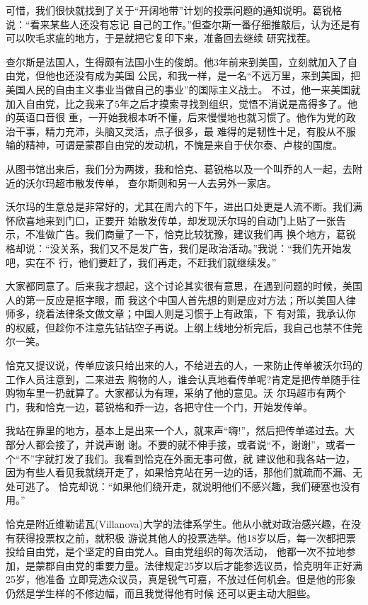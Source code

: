 ﻿\documentclass[11pt]{article}
\begin{document}
可惜，我们很快就找到了关于``开阔地带''计划的投票问题的通知说明。葛锐格说：``看来某些人还没有忘记
自己的工作。''但查尔斯一番仔细推敲后，认为还是有可以吹毛求疵的地方，于是就把它复印下来，准备回去继续
研究找茬。

查尔斯是法国人，生得颇有法国小生的俊朗。他3年前来到美国，立刻就加入了自由党，但他也还没有成为美国
公民，和我一样，是一名``不远万里，来到美国，把美国人民的自由主义事业当做自己的事业''的国际主义战士。
不过，他一来美国就加入自由党，比之我来了5年之后才摸索寻找到组织，觉悟不消说是高得多了。他的英语口音很
重，一开始我根本听不懂，后来慢慢地也就习惯了。他作为党的政治干事，精力充沛，头脑又灵活，点子很多，最
难得的是韧性十足，有股从不服输的精神，可谓是蒙郡自由党的发动机，不愧是来自于伏尔泰、卢梭的国度。

从图书馆出来后，我们分为两拨，我和恰克、葛锐格以及一个叫乔的人一起，去附近的沃尔玛超市散发传单，
查尔斯则和另一人去另外一家店。

沃尔玛的生意总是非常好的，尤其在周六的下午，进出口处更是人流不断。我们满怀欣喜地来到门口，正要开
始散发传单，却发现沃尔玛的自动门上贴了一张告示，不准做广告。我们商量了一下，恰克比较犹豫，建议我们再
换个地方，葛锐格却说：``没关系，我们又不是发广告，我们是政治活动。''我说：``我们先开始发吧，实在不
行，他们要赶了，我们再走，不赶我们就继续发。''

大家都同意了。后来我才想起，这个讨论其实很有意思，在遇到问题的时候，美国人的第一反应是抠字眼，而
我这个中国人首先想的则是应对方法；所以美国人律师多，绕着法律条文做文章；中国人则是习惯于上有政策，下
有对策，我承认你的权威，但趁你不注意先钻钻空子再说。上纲上线地分析完后，我自己也禁不住莞尔一笑。

恰克又提议说，传单应该只给出来的人，不给进去的人，一来防止传单被沃尔玛的工作人员注意到，二来进去
购物的人，谁会认真地看传单呢?肯定是把传单随手往购物车里一扔就算了。大家都认为有理，采纳了他的意见。沃
尔玛超市有两个门，我和恰克一边，葛锐格和乔一边，各把守住一个门，开始发传单。

我站在靠里的地方，基本上是出来一个人，就来声``嗨!''，然后把传单递过去。大部分人都会接了，并说声谢
谢。不要的就不伸手接，或者说``不，谢谢''，或者一个``不''字就打发了我们。我看到恰克在外面无事可做，就
建议他和我各站一边，因为有些人看见我就绕开走了，如果恰克站在另一边的话，那他们就疏而不漏、无处可逃了。
恰克却说：``如果他们绕开走，就说明他们不感兴趣，我们硬塞也没有用。''

恰克是附近维勒诺瓦(Villanova)大学的法律系学生。他从小就对政治感兴趣，在没有获得投票权之前，就积极
游说其他人的投票选举。他18岁以后，每一次都把票投给自由党，是个坚定的自由党人。自由党组织的每次活动，
他都一次不拉地参加，是蒙郡自由党的重要力量。法律规定25岁以后才能参选议员，恰克明年正好满25岁，他准备
立即竞选众议员，真是锐气可嘉，不放过任何机会。但是他的形象仍然是学生样的不修边幅，而且我觉得他有时候
还可以更主动大胆些。
\end{document}
